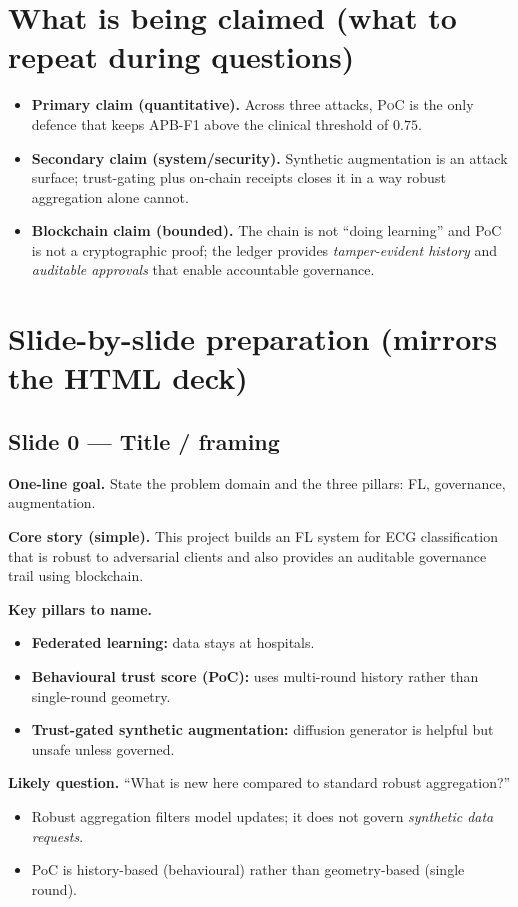 \documentclass[11pt,a4paper]{article}
\newcommand{\poc}{\textsc{PoC}\xspace}
\newcommand{\apbf}{APB-F1\xspace}
\begin{document}
\section{What is being claimed (what to repeat during questions)}

\begin{itemize}
\item \textbf{Primary claim (quantitative).} Across three attacks, \poc is the only defence that keeps \apbf above the clinical threshold of $0.75$.
\item \textbf{Secondary claim (system/security).} Synthetic augmentation is an attack surface; trust-gating plus on-chain receipts closes it in a way robust aggregation alone cannot.
\item \textbf{Blockchain claim (bounded).} The chain is not ``doing learning'' and PoC is not a cryptographic proof; the ledger provides \emph{tamper-evident history} and \emph{auditable approvals} that enable accountable governance.
\end{itemize}

\section{Slide-by-slide preparation (mirrors the HTML deck)}

\subsection{Slide 0 --- Title / framing}
\textbf{One-line goal.} State the problem domain and the three pillars: FL, governance, augmentation.

\textbf{Core story (simple).}
This project builds an FL system for ECG classification that is robust to adversarial clients and also provides an auditable governance trail using blockchain.

\textbf{Key pillars to name.}
\begin{itemize}
\item \textbf{Federated learning:} data stays at hospitals.
\item \textbf{Behavioural trust score (PoC):} uses multi-round history rather than single-round geometry.
\item \textbf{Trust-gated synthetic augmentation:} diffusion generator is helpful but unsafe unless governed.
\end{itemize}

\textbf{Likely question.} ``What is new here compared to standard robust aggregation?''
\begin{itemize}
\item Robust aggregation filters model updates; it does not govern \emph{synthetic data requests}.
\item PoC is history-based (behavioural) rather than geometry-based (single round).
\end{itemize}
\end{document}
